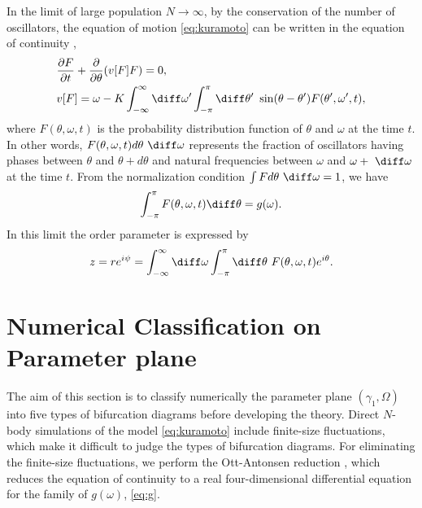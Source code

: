 In the limit of large population $N\to\infty$,
by the conservation of the number of oscillators,
the equation of motion \eqref{eq:kuramoto}
can be written in the equation of continuity \cite{lancellotti2004},
\begin{align}
\begin{aligned}
&\frac{\partial F}{\partial t}+\frac{\partial}{\partial\theta}(v[F]F)=0,\\
    &v[F]
    = \omega - K \int_{-\infty}^{\infty} \diff\omega' \int_{-\pi}^{\pi} \diff\theta'~
    \sin(\theta-\theta')F(\theta',\omega',t),
\end{aligned}
  \label{eq:kuramoto-inf}
\end{align}
where $F(\theta,\omega,t)$ is the probability distribution function
of $\theta$ and $\omega$ at the time $t$.
In other words, $F(\theta,\omega,t)d\theta ~\diff\omega$
represents the fraction
of oscillators having phases between $\theta$ and $\theta+d\theta$
and natural frequencies between $\omega$ and $\omega+~\diff\omega$
at the time $t$.
From the normalization condition $\int Fd\theta ~\diff\omega=1$, we have
\begin{align}
  \int_{-\pi}^{\pi} F(\theta,\omega,t)\diff\theta=g(\omega).
\end{align}
In this limit the order parameter is expressed by
\begin{align}
  z=re^{i\psi}=\int_{-\infty}^{\infty} \diff\omega \int_{-\pi}^{\pi} \diff\theta
  ~ F(\theta,\omega,t) e^{i\theta}.
\end{align}



\section{Numerical Classification on Parameter plane}
\label{sec:numerics}

The aim of this section is to classify numerically the parameter plane
$(\gamma_{1},\Omega)$ into five types of bifurcation diagrams
\cite{terada2018} before developing the theory.
Direct $N$-body simulations of the model \eqref{eq:kuramoto}
include finite-size fluctuations, which make it difficult
to judge the types of bifurcation diagrams.
For eliminating the finite-size fluctuations,
we perform the Ott-Antonsen reduction \cite{oa2008,oa2009},
which reduces the equation of continuity
to a real four-dimensional differential equation
for the family of $g(\omega)$, \eqref{eq:g}.


